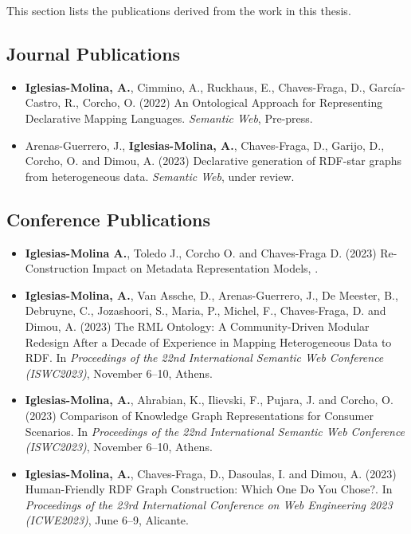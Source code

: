 This section lists the publications derived from the work in this thesis.

\subsection{Journal Publications}

\begin{itemize}
    \item \textbf{Iglesias-Molina, A.}, Cimmino, A., Ruckhaus, E., Chaves-Fraga, D., García-Castro, R., Corcho, O. (2022) An Ontological Approach for Representing Declarative Mapping Languages. \textit{Semantic Web}, Pre-press. 

    \item Arenas-Guerrero, J., \textbf{Iglesias-Molina, A.}, Chaves-Fraga, D., Garijo, D., Corcho, O. and Dimou, A. (2023) Declarative generation of RDF-star graphs from heterogeneous data. \textit{Semantic Web}, under review.
\end{itemize}


\subsection{Conference Publications}
\begin{itemize}
    \item \textbf{Iglesias-Molina A.}, Toledo J., Corcho O. and Chaves-Fraga D. (2023) Re-Construction Impact on Metadata Representation Models, .

    \item \textbf{Iglesias-Molina, A.}, Van Assche, D., Arenas-Guerrero, J., De Meester, B., Debruyne, C., Jozashoori, S., Maria, P., Michel, F., Chaves-Fraga, D. and Dimou, A. (2023) The RML Ontology: A Community-Driven Modular Redesign After a Decade of Experience in Mapping Heterogeneous Data to RDF. In \textit{Proceedings of the 22nd International Semantic Web Conference (ISWC2023)}, November 6--10, Athens.

    \item \textbf{Iglesias-Molina, A.}, Ahrabian, K., Ilievski, F., Pujara, J. and Corcho, O. (2023) Comparison of Knowledge Graph Representations for Consumer Scenarios. In \textit{Proceedings of the 22nd International Semantic Web Conference (ISWC2023)}, November 6--10, Athens.

    \item \textbf{Iglesias-Molina, A.}, Chaves-Fraga, D., Dasoulas, I. and Dimou, A. (2023) Human-Friendly RDF Graph Construction: Which One Do You Chose?. In \textit{Proceedings of the 23rd International Conference on Web Engineering 2023 (ICWE2023)}, June 6--9, Alicante.
\end{itemize}


